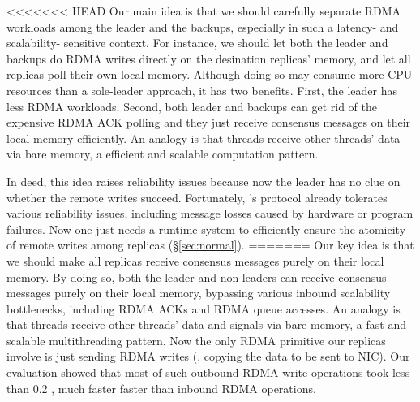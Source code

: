<<<<<<< HEAD
Our main idea is that we should carefully separate RDMA workloads among 
the leader and the backups, especially in such a latency- and scalability- 
sensitive context. For instance, we should let both the leader and backups 
do RDMA writes directly on the desination replicas' memory, and let all 
replicas poll their own local memory. Although doing so may consume more CPU 
resources than a sole-leader approach, it has two benefits. First, the 
leader has less RDMA workloads. Second, both leader and backups can get rid of 
the expensive RDMA ACK polling and they just receive consensus messages on their 
local memory efficiently. An analogy is that threads receive other threads' data 
via bare memory, a efficient and scalable computation pattern.



In deed, this idea raises reliability issues because now the leader has no clue 
on whether the remote writes succeed. Fortunately, \paxos's protocol already 
tolerates various reliability issues, including message losses caused by 
hardware or program failures. Now one just needs a runtime system to efficiently 
ensure the atomicity of remote writes among replicas (\S\ref{sec:normal}).
=======
Our key idea is that we should make all \paxos replicas receive consensus
messages purely on their local memory. By doing so, both the leader and
non-leaders can receive consensus messages purely on their local memory,
bypassing various inbound scalability bottlenecks, including RDMA ACKs and RDMA
queue accesses. An analogy is that threads receive other threads' data and
signals via bare memory, a fast and scalable multithreading pattern. Now the
only RDMA primitive our \paxos replicas involve is just sending RDMA writes
(\ie, copying the data to be sent to NIC). Our evaluation showed that
most of such outbound RDMA write operations took less than 0.2 \us, much faster
faster than inbound RDMA operations.

